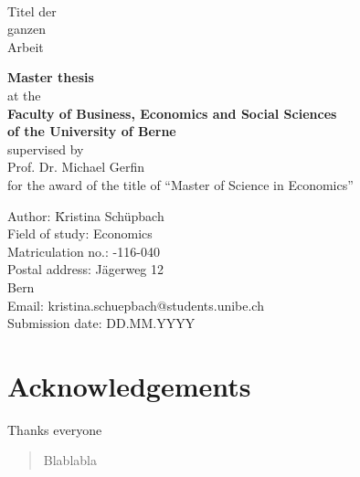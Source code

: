 % 


\thispagestyle{empty}
\ \vspace{1.0cm}
\begin{center}
{\LARGE
Titel der \\[0.1cm]
ganzen \\[0.1cm]
Arbeit \\[1cm]
}

{
{\bf Master thesis} \\
at the \\[0.5cm]
{\bf Faculty of Business, Economics and Social Sciences} \\
{\bf of the University of Berne} \\[0.5cm]
supervised by \\
Prof. Dr. Michael Gerfin\\
for the award of the title of ``Master of Science in Economics'' \\[2.5cm]
}

\hspace{1cm}\begin{minipage}[h]{20cm}
\begin{tabbing}
Author: \hspace{2cm} \= Kristina Sch\"upbach \\
Field of study: \> Economics \\
Matriculation no.: -116-040 \\
Postal address: \> J\"agerweg 12 \\
 Bern \\
Email: \> kristina.schuepbach@students.unibe.ch \\
Submission date: \> DD.MM.YYYY \\
\end{tabbing}
\end{minipage}
\end{center}
\newpage





\section*{Acknowledgements}
Thanks everyone
\pagebreak


\begin{abstract}
Blablabla 
\end{abstract}
\newpage


